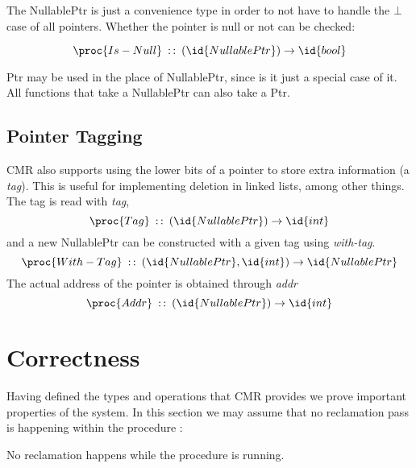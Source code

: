 The NullablePtr is just a convenience type in order to not have to handle the $\bot$ case of all
pointers. Whether the pointer is null or not can be checked:

\begin{equation}\label{eq:nullable-is-null}
  \proc{Is-Null}\typeof (\id{NullablePtr}) \to \id{bool}
\end{equation}

Ptr may be used in the place of NullablePtr, since is it just a special case of it. All functions
that take a NullablePtr can also take a Ptr.



\subsection{Pointer Tagging}

CMR also supports using the lower bits of a pointer to store extra information (a \emph{tag}). This
is useful for implementing deletion in linked lists, among other things. The tag is read with
\emph{tag},
\begin{equation}\label{eq:ptr-tag}
  \proc{Tag}\typeof{} (\id{NullablePtr}) \to \id{int}
\end{equation}
and a new NullablePtr can be constructed with a given tag using \emph{with-tag}.
\begin{equation}\label{eq:ptr-with-tag}
  \proc{With-Tag}\typeof{} (\id{NullablePtr}, \id{int}) \to \id{NullablePtr}
\end{equation}
The actual address of the pointer is obtained through \emph{addr}
\begin{equation}\label{eq:ptr-addr}
  \proc{Addr}\typeof{} (\id{NullablePtr}) \to \id{int}
\end{equation}



\section{Correctness\label{sec:cmr-correctness}}

Having defined the types and operations that CMR provides we prove important properties of the
system. In this section we may assume that no reclamation pass is happening within the procedure
:

\begin{claim}
  \label{def:load-atomic-no-reclamation}
  No reclamation happens while the procedure  is running.
\end{claim}

